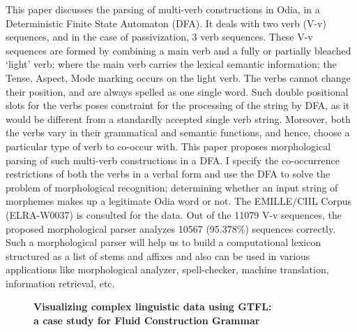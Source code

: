 \documentclass[10pt, a4paper, twopage, headinclude, footinclude, BCOR5mm]{book}
\begin{document}
\begin{table}[t!]
\end{table} 
\noindent
This paper discusses the parsing of multi-verb constructions in Odia, in a Deterministic Finite State Automaton (DFA).  It deals with two verb (V-v) sequences, and in the case of passivization, 3 verb sequences. These V-v sequences are formed by combining a main verb and a fully or partially bleached ‘light’ verb; where the main verb carries the lexical semantic information; the Tense, Aspect, Mode marking occurs on the light verb. The verbs cannot change their position, and are always spelled as one single word. Such double positional slots for the verbs poses constraint for the processing of the string by DFA, as it would be different from a standardly accepted single verb string. Moreover, both the verbs vary in their grammatical and semantic functions, and hence, choose a particular type of verb to co-occur with. This paper proposes morphological parsing of such multi-verb constructions in a DFA. I specify the co-occurrence restrictions of both the verbs in a verbal form and  use the DFA to solve the problem of morphological recognition; determining whether an input string of morphemes makes up a legitimate Odia word or not. The EMILLE/CIIL Corpus (ELRA-W0037) is consulted for the data.  Out of the 11079 V-v sequences, the proposed morphological parser analyzes 10567 (95.378\%) sequences correctly.  Such a morphological parser will help us to build a computational lexicon structured as a list of stems and affixes and also can be used in various applications like morphological analyzer,  spell-checker, machine translation, information retrieval, etc.  

\newpage

\begin{figure}[t!]
\centering
\large\textbf{Visualizing complex linguistic data using GTFL: \\ a case study for Fluid Construction Grammar}
\vspace*{0.5cm}
\end{figure}
\end{document}
